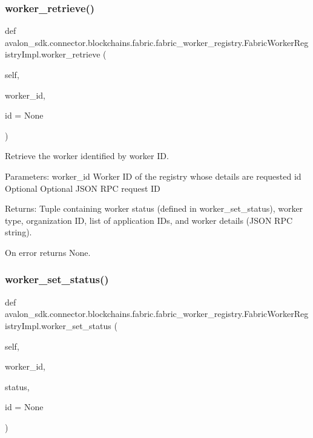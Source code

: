 \subsubsection{\texorpdfstring{worker\+\_\+retrieve()}{worker\_retrieve()}}
{\footnotesize\ttfamily def avalon\+\_\+sdk.\+connector.\+blockchains.\+fabric.\+fabric\+\_\+worker\+\_\+registry.\+Fabric\+Worker\+Registry\+Impl.\+worker\+\_\+retrieve (\begin{DoxyParamCaption}\item[{}]{self,  }\item[{}]{worker\+\_\+id,  }\item[{}]{id = {\ttfamily None} }\end{DoxyParamCaption})}

\begin{DoxyVerb}Retrieve the worker identified by worker ID.

Parameters:
worker_id  Worker ID of the registry whose details are requested
id         Optional Optional JSON RPC request ID

Returns:
Tuple containing worker status (defined in worker_set_status),
worker type, organization ID, list of application IDs, and worker
details (JSON RPC string).

On error returns None.
\end{DoxyVerb}
 \mbox{\label{classavalon__sdk_1_1connector_1_1blockchains_1_1fabric_1_1fabric__worker__registry_1_1FabricWorkerRegistryImpl_aabbb04881481e5d2ffd76f9bfc16088f}} 
\subsubsection{\texorpdfstring{worker\+\_\+set\+\_\+status()}{worker\_set\_status()}}
{\footnotesize\ttfamily def avalon\+\_\+sdk.\+connector.\+blockchains.\+fabric.\+fabric\+\_\+worker\+\_\+registry.\+Fabric\+Worker\+Registry\+Impl.\+worker\+\_\+set\+\_\+status (\begin{DoxyParamCaption}\item[{}]{self,  }\item[{}]{worker\+\_\+id,  }\item[{}]{status,  }\item[{}]{id = {\ttfamily None} }\end{DoxyParamCaption})}

